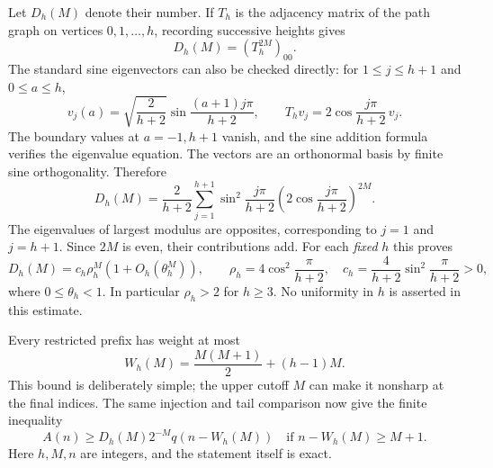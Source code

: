 \documentclass[11pt,letterpaper]{article}
\numberwithin{equation}{section}
\theoremstyle{remark}\newtheorem{remark}[theorem]{Remark}
\begin{document}
Let $D_h(M)$ denote their number. If $T_h$ is the adjacency matrix
of the path graph on vertices $0,1,\ldots,h$, recording successive
heights gives
\begin{equation}\label{dgp:conj:eq:walk}
 D_h(M)=(T_h^{2M})_{00}.
\end{equation}
The standard sine eigenvectors can also be checked directly:
for $1\leq j\leq h+1$ and $0\leq a\leq h$,
\[
 v_j(a)=\sqrt{\frac2{h+2}}\sin\frac{(a+1)j\pi}{h+2},\qquad
 T_hv_j=2\cos\frac{j\pi}{h+2}\,v_j.
\]
The boundary values at $a=-1,h+1$ vanish, and the sine addition
formula verifies the eigenvalue equation. The vectors are an
orthonormal basis by finite sine orthogonality. Therefore
\begin{equation}\label{dgp:conj:eq:spectral}
 D_h(M)=\frac2{h+2}\sum_{j=1}^{h+1}
 \sin^2\frac{j\pi}{h+2}
 \left(2\cos\frac{j\pi}{h+2}\right)^{2M}.
\end{equation}
The eigenvalues of largest modulus are opposites, corresponding to
$j=1$ and $j=h+1$. Since $2M$ is even, their contributions add.
For each \emph{fixed} $h$ this proves
\begin{equation}\label{dgp:conj:eq:heightasymp}
 D_h(M)=c_h\rho_h^M(1+O_h(\theta_h^M)),\qquad
 \rho_h=4\cos^2\frac\pi{h+2},\quad
 c_h=\frac4{h+2}\sin^2\frac\pi{h+2}>0,
\end{equation}
where $0\leq\theta_h<1$. In particular $\rho_h>2$ for $h\geq3$.
No uniformity in $h$ is asserted in this estimate.

Every restricted prefix has weight at most
\begin{equation}\label{dgp:conj:eq:weight}
 W_h(M)=\frac{M(M+1)}2+(h-1)M.
\end{equation}
This bound is deliberately simple; the upper cutoff $M$ can make
it nonsharp at the final indices. The same injection and tail
comparison now give the finite inequality
\begin{equation}\label{dgp:conj:eq:finiteheight}
 A(n)\geq D_h(M)2^{-M}q(n-W_h(M))
 \quad\text{if }n-W_h(M)\geq M+1.
\end{equation}
Here $h,M,n$ are integers, and the statement itself is exact.
\end{document}
